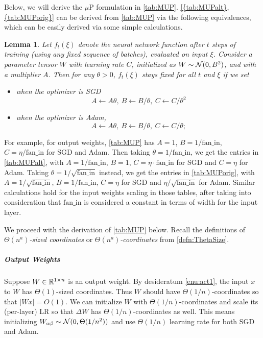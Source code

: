 \documentclass{article}
\newtheorem{lem}[thm]{Lemma}
\theoremstyle{definition}
\newcommand{\fanin}{\mathrm{fan\_in}}
\begin{document}
    Below, we will derive the $\mu$P formulation in \cref{tab:MUP}.
    \cref{{tab:MUPalt},{tab:MUPorig}} can be derived from \cref{tab:MUP} via the following equivalences, which can be easily derived via some simple calculations.

    \begin{lem}\label{lem:scalingEquivalences}
      Let $f_t(\xi)$ denote the neural network function after $t$ steps of training (using any fixed sequence of batches), evaluated on input $\xi$.
      Consider a parameter tensor $W$ with learning rate $C$, initialized as $W \sim \mathcal{N}(0, B^2)$, and with a multiplier $A$. Then for any $\theta > 0$, $f_t(\xi)$ stays fixed for all $t$ and $\xi$ if we set 
      \begin{itemize}
        \item when the optimizer is SGD
        \[
          A \gets A \theta,\ B \gets B / \theta,\ C \gets C / \theta^2
        \]
        \item when the optimizer is Adam, 
        \[
          A \gets A \theta,\ B \gets B / \theta,\ C \gets C / \theta;
        \]
      \end{itemize}
    \end{lem}

    For example, for output weights, \cref{tab:MUP} has $A = 1$, $B = 1/\fanin$, $C = \eta/\fanin$ for SGD and Adam.
    Then taking $\theta = 1/\fanin$, we get the entries in \cref{tab:MUPalt}, with $A=1/\fanin$, $B=1$, $C = \eta \cdot \fanin$ for SGD and $C = \eta$ for Adam.
    Taking $\theta = 1/\sqrt{\fanin}$ instead, we get the entries in \cref{tab:MUPorig}, with $A = 1/\sqrt{\fanin}$, $B = 1/\fanin$, $C = \eta$ for SGD and $\eta/\sqrt{\fanin}$ for Adam.
    Similar calculations hold for the input weights scaling in those tables, after taking into consideration that $\fanin$ is considered a constant in terms of width for the input layer.

    

    We proceed with the derivation of \cref{tab:MUP} below.
    Recall the definitions of \emph{$\Theta(n^a)$-sized coordinates} or \emph{$\Theta(n^a)$-coordinates} from \cref{defn:ThetaSize}.
    
    \subparagraph*{Output Weights}
    
    Suppose $W\in\mathbb{R}^{1\times n}$ is an output weight. By desideratum \ref{enu:act1}, the input $x$ to $W$ has $\Theta(1)$-sized coordinates. Thus $W$ should have $\Theta(1/n)$-coordinates so that $|Wx|=O(1)$. We can initialize $W$ with $\Theta(1/n)$-coordinates and scale its (per-layer) LR so that $\Delta W$ has $\Theta(1/n)$-coordinates as well.
    This means initializing $W_{\alpha\beta} \sim \mathcal{N}(0, \Theta(1/n^2))$ and use $\Theta(1/n)$ learning rate for both SGD and Adam.
    
\end{document}
